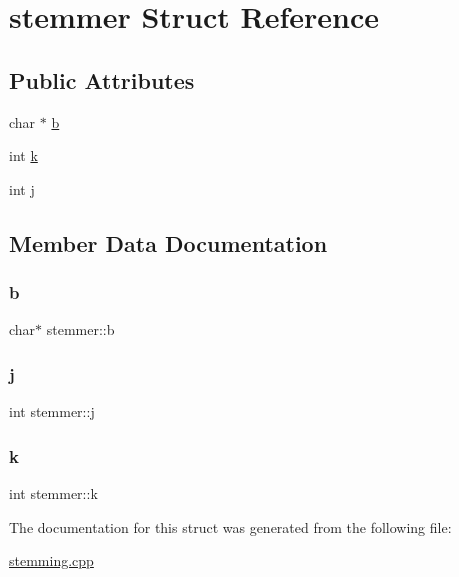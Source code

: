 \hypertarget{structstemmer}{}\section{stemmer Struct Reference}
\label{structstemmer}
\subsection*{Public Attributes}
\begin{DoxyCompactItemize}
\item 
char $\ast$ \hyperlink{structstemmer_a0ae99db94786418a0c4d85a2a15382a5}{b}
\item 
int \hyperlink{structstemmer_a587d5f8fd5c491688bc91e7d3b5e262e}{k}
\item 
int \hyperlink{structstemmer_a024d42a47e06bd5207e2494cbfefbf2f}{j}
\end{DoxyCompactItemize}


\subsection{Member Data Documentation}
\hypertarget{structstemmer_a0ae99db94786418a0c4d85a2a15382a5}{}\label{structstemmer_a0ae99db94786418a0c4d85a2a15382a5} 
\subsubsection{\texorpdfstring{b}{b}}
{\footnotesize\ttfamily char$\ast$ stemmer\+::b}

\hypertarget{structstemmer_a024d42a47e06bd5207e2494cbfefbf2f}{}\label{structstemmer_a024d42a47e06bd5207e2494cbfefbf2f} 
\subsubsection{\texorpdfstring{j}{j}}
{\footnotesize\ttfamily int stemmer\+::j}

\hypertarget{structstemmer_a587d5f8fd5c491688bc91e7d3b5e262e}{}\label{structstemmer_a587d5f8fd5c491688bc91e7d3b5e262e} 
\subsubsection{\texorpdfstring{k}{k}}
{\footnotesize\ttfamily int stemmer\+::k}



The documentation for this struct was generated from the following file\+:\begin{DoxyCompactItemize}
\item 
\hyperlink{stemming_8cpp}{stemming.\+cpp}\end{DoxyCompactItemize}
